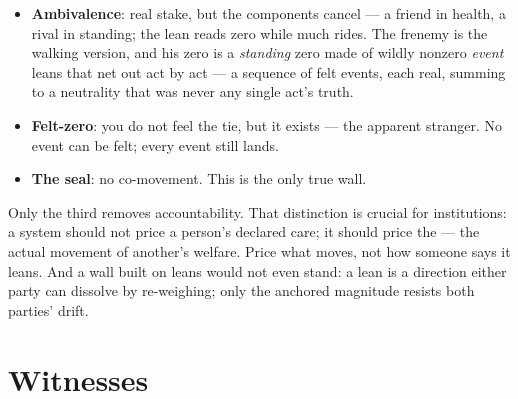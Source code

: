 \documentclass[../main_explainer]{subfiles}
\begin{document}

\begin{itemize}[leftmargin=*]
\item \textbf{Ambivalence}: real stake, but the components cancel --- a friend in
  health, a rival in standing; the lean reads zero while much rides. The frenemy is the
  walking version, and his zero is a \emph{standing} zero made of wildly nonzero
  \emph{event} leans that net out act by act --- a sequence of felt events, each real,
  summing to a neutrality that was never any single act's truth.
\item \textbf{Felt-zero}: you do not feel the tie, but it exists --- the apparent
  stranger. No event can be felt; every event still lands.
\item \textbf{The seal}: no co-movement. This is the only true wall.
\end{itemize}

Only the third removes accountability. That distinction is crucial for institutions: a
system should not price a person's declared care; it should price the
 ---
the actual movement of another's welfare. Price what moves, not how someone says it
leans. And a wall built on leans would not even stand: a lean is a direction either
party can dissolve by re-weighing; only the anchored magnitude resists both parties'
drift.


\section{Witnesses}
\label{sec:explainer:witnesses}
\end{document}
